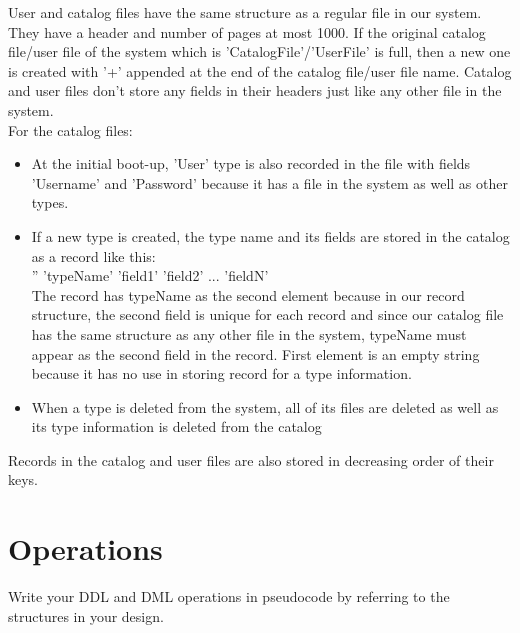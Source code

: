\documentclass{article}
\begin{document}
User and catalog files have the same structure as a regular file in our system. They have a header and number of pages at most 1000. If the original catalog file/user file of the system which is 'CatalogFile'/'UserFile' is full, then a new one is created with '+' appended at the end of the catalog file/user file  name. Catalog and user files don't store any fields in their headers just like any other file in the system. \\
For the catalog files:
\begin{itemize}
    \item At the initial boot-up, 'User' type is also recorded in the file with fields 'Username' and 'Password' because it has a file in the system as well as other types.
    \item If a new type is created, the type name and its fields are stored in the catalog as a record like this:\\
    '' 'typeName' 'field1' 'field2' ... 'fieldN'\\
    The record has typeName as the second element because in our record structure, the second field is unique for each record and since our catalog file has the same structure as any other file in the system, typeName must appear as the second field in the record. First element is an empty string because it has no use in storing record for a type information.
    \item When a type is deleted from the system, all of its files are deleted as well as its type information is deleted from the catalog\\
\end{itemize}
Records in the catalog and user files are also stored in decreasing order of their keys.


\newline \newline
\section{Operations}
\label{sec:operations}
Write your DDL and DML operations in pseudocode by referring to the structures in your design.
\end{document}
